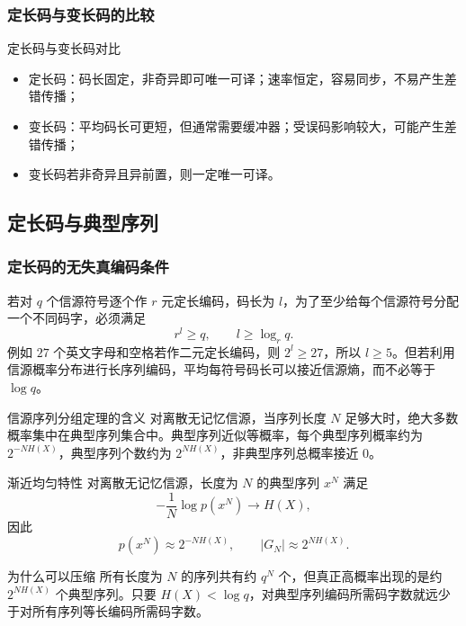 \subsubsection{定长码与变长码的比较}

\begin{methodBox}{定长码与变长码对比}
\begin{itemize}
  \item 定长码：码长固定，非奇异即可唯一可译；速率恒定，容易同步，不易产生差错传播；
  \item 变长码：平均码长可更短，但通常需要缓冲器；受误码影响较大，可能产生差错传播；
  \item 变长码若非奇异且异前置，则一定唯一可译。
\end{itemize}
\end{methodBox}

\subsection{定长码与典型序列}

\subsubsection{定长码的无失真编码条件}
若对 $q$ 个信源符号逐个作 $r$ 元定长编码，码长为 $l$，为了至少给每个信源符号分配一个不同码字，必须满足
\[
r^l\ge q,
\qquad l\ge \log_r q.
\]
例如 $27$ 个英文字母和空格若作二元定长编码，则 $2^l\ge27$，所以 $l\ge5$。但若利用信源概率分布进行长序列编码，平均每符号码长可以接近信源熵，而不必等于 $\log q$。

\begin{theoremBox}{信源序列分组定理的含义}
对离散无记忆信源，当序列长度 $N$ 足够大时，绝大多数概率集中在典型序列集合中。典型序列近似等概率，每个典型序列概率约为 $2^{-N H(X)}$，典型序列个数约为 $2^{N H(X)}$，非典型序列总概率接近 $0$。
\end{theoremBox}

\begin{formulaBox}{渐近均匀特性}
对离散无记忆信源，长度为 $N$ 的典型序列 $x^N$ 满足
\[
-\frac{1}{N}\log p(x^N)\to H(X),
\]
因此
\[
p(x^N)\approx 2^{-N H(X)},\qquad |G_N|\approx 2^{N H(X)}.
\]
\end{formulaBox}

\begin{keypoint}{为什么可以压缩}
所有长度为 $N$ 的序列共有约 $q^N$ 个，但真正高概率出现的是约 $2^{N H(X)}$ 个典型序列。只要 $H(X)<\log q$，对典型序列编码所需码字数就远少于对所有序列等长编码所需码字数。
\end{keypoint}

